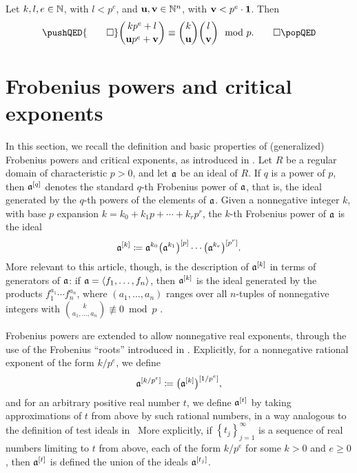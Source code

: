 \documentclass[11pt]{amsart}
\begin{document}
\begin{corollary}
   \label{cor: multinomial congruence}
   Let $k,l,e\in \mathbb{N}$, with $l<p^e$, and $\mathbf{u},\mathbf{v}\in \mathbb{N}^n$, with $\mathbf{v}<p^e\cdot \mathbf{1}$.
   Then
   \[
      \pushQED{\qed}
      \binom{kp^e+l}{\vv{u}p^e+\vv{v}}\equiv \binom{k}{\vv{u}}\binom{l}{\vv{v}} \mod{p}.\qedhere
      \popQED
   \]
\end{corollary}

\newpage
\section{Frobenius powers and critical exponents}

In this section, we recall the definition and basic properties of (generalized) Frobenius powers and critical exponents, as introduced in \cite{hernandez+etal.frobenius_powers}.
Let $R$ be a regular domain of characteristic $p > 0$, and let $\mathfrak{a}$ be an ideal of $R$.
If $q$ is a power of $p$, then $\mathfrak{a}^{[q]}$ denotes the standard $q$-th Frobenius power of $\mathfrak{a}$, that is, the ideal generated by the $q$-th powers of the elements of $\mathfrak{a}$.
Given a nonnegative integer $k$, with base $p$ expansion $k = k_0 + k_1 p + \cdots + k_r p^r$, the $k$-th Frobenius power of $\mathfrak{a}$ is the ideal
\[\mathfrak{a}^{[k]} \coloneqq \mathfrak{a}^{k_0}\big(\mathfrak{a}^{k_1}\big)^{[p]}\cdots \big(\mathfrak{a}^{k_r}\big)^{[p^r]}.\]
More relevant to this article, though, is the description of $\mathfrak{a}^{[k]}$ in terms of generators of $\mathfrak{a}$: if $\mathfrak{a} = \langle f_1,\ldots,f_n \rangle$, then $\mathfrak{a}^{[k]}$ is the ideal generated by the products $f_1^{a_1}\cdots f_n^{a_n}$, where $(a_1,\ldots,a_n)$ ranges over all $n$-tuples of nonnegative integers with $\binom{k}{a_1,\ldots,a_n}\not\equiv 0\bmod{p}$ \cite[Proposition~3.5]{hernandez+etal.frobenius_powers}.

Frobenius powers are extended to allow nonnegative real exponents, through the use of the Frobenius ``roots'' introduced in \cite{blickle+mustata+smith.discr_rat_FPTs}.
Explicitly, for a nonnegative rational exponent of the form $k/p^e$, we define
\[\mathfrak{a}^{[k/p^e]} \coloneqq \big(\mathfrak{a}^{[k]}\big)^{[1/p^e]},\]
and for an arbitrary positive real number $t$, we define $\mathfrak{a}^{[t]}$ by taking approximations of $t$ from above by such rational numbers, in a way analogous to the definition of test ideals in \loccit\ 
More explicitly, if $\left\{t_j\right\}_{j=1}^\infty$ is a sequence of real numbers limiting to $t$ from above, each of the form $k/p^e$ for some $k>0$ and $e \geq 0$, then $\mathfrak{a}^{[t]}$ is defined the union of the ideals $\mathfrak{a}^{[t_j]}$.
\end{document}
